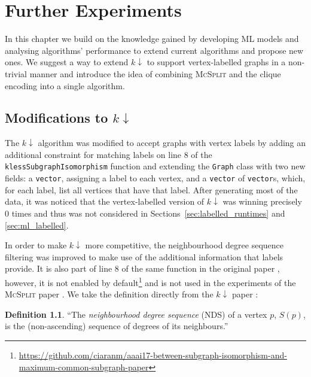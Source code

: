 \documentclass{l4proj}
\theoremstyle{definition}
\newtheorem{definition}{Definition}[chapter]
\theoremstyle{remark}
\begin{document}
\chapter{Further Experiments} \label{chapter:further}

In this chapter we build on the knowledge gained by developing ML models and
analysing algorithms' performance to extend current algorithms and propose new
ones. We suggest a way to extend $k{\downarrow}$ to support vertex-labelled
graphs in a non-trivial manner and introduce the idea of combining
\textsc{McSplit} and the clique encoding into a single algorithm.

\section{Modifications to \texorpdfstring{$k{\downarrow}$}{kdown}}

The $k{\downarrow}$ algorithm was modified to accept graphs with vertex
labels by adding an additional constraint for matching labels on line 8 of the
\texttt{klessSubgraphIsomorphism} function \cite{DBLP:conf/aaai/HoffmannMR17}
and extending the \texttt{Graph} class with two new fields: a \texttt{vector},
assigning a label to each vertex, and a \texttt{vector} of \texttt{vector}s,
which, for each label, list all vertices that have that label. After generating
most of the data, it was noticed that the vertex-labelled version of
$k{\downarrow}$ was winning precisely 0 times and thus was not considered in
Sections~\ref{sec:labelled_runtimes} and \ref{sec:ml_labelled}.

In order to make $k{\downarrow}$ more competitive, the neighbourhood degree
sequence filtering was improved to make use of the additional information that
labels provide. It is also part of line 8 of the same function in the original
paper \cite{DBLP:conf/aaai/HoffmannMR17}, however, it is not enabled by
default\footnote{\url{https://github.com/ciaranm/aaai17-between-subgraph-isomorphism-and-maximum-common-subgraph-paper}}
and is not used in the experiments of the \textsc{McSplit} paper
\cite{DBLP:conf/ijcai/McCreeshPT17}. We take the definition directly from the
$k{\downarrow}$ paper \cite{DBLP:conf/aaai/HoffmannMR17}:

\begin{definition}
  ``The \emph{neighbourhood degree sequence} (NDS) of a vertex $p$, $S(p)$, is the
  (non-ascending) sequence of degrees of its neighbours.''
\end{definition}
\end{document}
